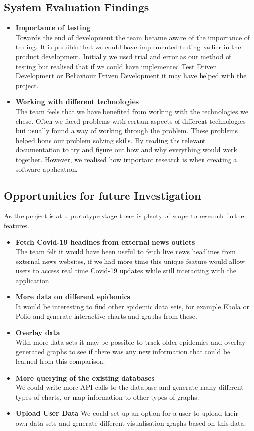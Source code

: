 \subsection{System Evaluation Findings}
\begin{itemize}
\item \textbf{Importance of testing}\\
Towards the end of development the team became aware of the importance of testing. It is possible that we could have implemented testing earlier in the product development. Initially we used trial and error as our method of testing but realised that if we could have implemented Test Driven Development or Behaviour Driven Development it may have helped with the project. 
\item \textbf{Working with different technologies}\\
The team feels that we have benefited from working with the technologies we chose. Often we faced problems with certain aspects of different technologies but usually found a way of working through the problem. These problems helped hone our problem solving skills. By reading the relevant documentation to try and figure out how and why everything would work together. However, we realised how important research is when creating a software application.

\end{itemize}

 \subsection{Opportunities for future Investigation}
As the project is at a prototype stage there is plenty of scope to research further features.
\begin{itemize}
\item \textbf{Fetch Covid-19 headines from external news outlets}\\
The team felt it would have been useful to fetch live news headlines from external news websites, if we had more time this unique feature would allow users to access real time Covid-19 updates while still interacting with the application.
\item \textbf{More data on different epidemics}\\
It would be interesting to find other epidemic data sets, for example Ebola or Polio and generate interactive charts and graphs from these.
\item \textbf{Overlay data}\\
With more data sets it may be possible to track older epidemics and overlay generated graphs to see if there was any new information that could be learned from this comparison.
\item \textbf{More querying of the existing databases}\\
We could write more API calls to the database and generate many different types of charts, or map information to other types of graphs.
\item \textbf{Upload User Data}
We could set up an option for a user to upload their own data sets and generate different visualisation graphs based on this data.
\end{itemize}




